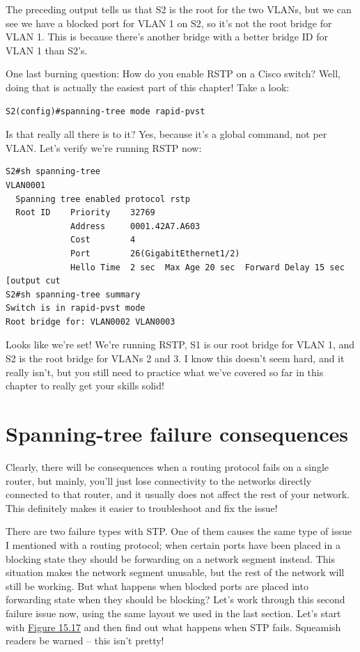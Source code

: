 The preceding output tells us that S2 is the root for the two VLANs, but
we can see we have a blocked port for VLAN 1 on S2, so it's not the root
bridge for VLAN 1. This is because there's another bridge with a better
bridge ID for VLAN 1 than S2's.

One last burning question: How do you enable RSTP on a Cisco switch?
Well, doing that is actually the easiest part of this chapter! Take a
look:

\begin{verbatim}
S2(config)#spanning-tree mode rapid-pvst
\end{verbatim}

Is that really all there is to it? Yes, because it's a global command,
not per VLAN. Let's verify we're running RSTP now:

\begin{verbatim}
S2#sh spanning-tree
VLAN0001
  Spanning tree enabled protocol rstp
  Root ID    Priority    32769
             Address     0001.42A7.A603
             Cost        4
             Port        26(GigabitEthernet1/2)
             Hello Time  2 sec  Max Age 20 sec  Forward Delay 15 sec
[output cut
S2#sh spanning-tree summary
Switch is in rapid-pvst mode
Root bridge for: VLAN0002 VLAN0003
\end{verbatim}

Looks like we're set! We're running RSTP, S1 is our root bridge for VLAN
1, and S2 is the root bridge for VLANs 2 and 3. I know this doesn't seem
hard, and it really isn't, but you still need to practice what we've
covered so far in this chapter to really get your skills solid!

\section{Spanning-tree failure consequences}

Clearly, there will be consequences when a routing protocol fails on a
single router, but mainly, you'll just lose connectivity to the networks
directly connected to that router, and it usually does not affect the
rest of your network. This definitely makes it easier to troubleshoot
and fix the issue!

There are two failure types with STP. One of them causes the same type
of issue I mentioned with a routing protocol; when certain ports have
been placed in a blocking state they should be forwarding on a network
segment instead. This situation makes the network
segment unusable, but
the rest of the network will still be working. But what happens when
blocked ports are placed into forwarding state when they should be
blocking? Let's work through this second failure issue now, using the
same layout we used in the last section. Let's start with
\protect\hyperlink{c15.xhtmlux5cux23figure15-17}{Figure 15.17} and then
find out what happens when STP fails. Squeamish readers be warned -- this
isn't pretty!

